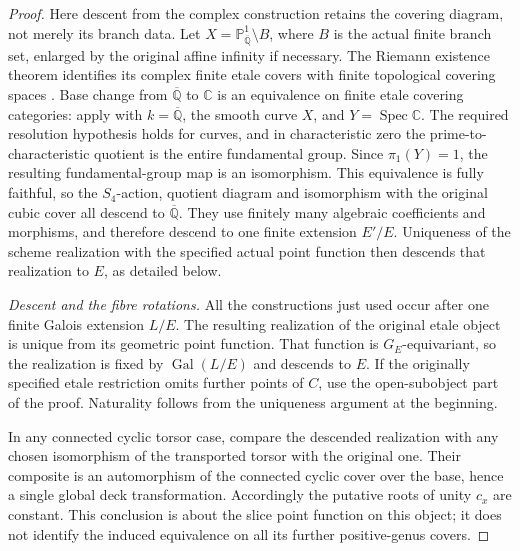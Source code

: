 \begin{proof}
Here descent from the complex construction retains the
covering diagram, not merely its branch data. Let
\(X=\mathbb P^1_{\overline{\mathbb Q}}\setminus B\),
where \(B\) is the actual finite branch set, enlarged
by the original affine infinity if necessary. The
Riemann existence theorem identifies its complex finite
etale covers with finite topological covering spaces
\citep[Expose~XII, Theoreme~5.1]{FF_SGA1}.
Base change from \(\overline{\mathbb Q}\) to
\(\mathbb C\) is an equivalence on finite etale
covering categories: apply
\citet[Expose~XIII, Proposition~4.6(a)]{FF_SGA1}
with \(k=\overline{\mathbb Q}\), the smooth curve
\(X\), and \(Y=\operatorname{Spec}\mathbb C\).
The required resolution hypothesis holds for curves,
and in characteristic zero the prime-to-characteristic
quotient is the entire fundamental group. Since
\(\pi_1(Y)=1\), the resulting fundamental-group map
is an isomorphism. This equivalence is fully faithful,
so the \(S_4\)-action, quotient diagram and isomorphism
with the original cubic cover all descend to
\(\overline{\mathbb Q}\). They use finitely many
algebraic coefficients and morphisms, and therefore
descend to one finite extension \(E'/E\).
Uniqueness of the scheme realization with the specified
actual point function then descends that realization
to \(E\), as detailed below.

\emph{Descent and the fibre rotations.}
All the constructions just used occur after one finite
Galois extension \(L/E\). The resulting realization
of the original etale object is unique from its
geometric point function. That function is
\(G_E\)-equivariant, so the realization is fixed by
\(\operatorname{Gal}(L/E)\) and descends to \(E\).
If the originally specified etale restriction omits
further points of \(C\), use the open-subobject part
of the proof. Naturality follows from the uniqueness
argument at the beginning.

In any connected cyclic torsor case, compare the descended
realization with any chosen isomorphism of the
transported torsor with the original one. Their
composite is an automorphism of the connected cyclic
cover over the base, hence a single global deck
transformation. Accordingly the putative roots of unity
\(c_x\) are constant. This conclusion is about
the slice point function on this object; it does not
identify the induced equivalence on all its further
positive-genus covers.
\end{proof}


